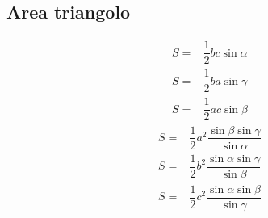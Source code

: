\subsection{Area triangolo}
\begin{align*}
S=&\dfrac{1}{2}bc\sin\alpha\\
S=&\dfrac{1}{2}ba\sin\gamma\\
S=&\dfrac{1}{2}ac\sin\beta
\end{align*}
\begin{align*}
S=&\dfrac{1}{2}a^2\dfrac{\sin\beta\sin\gamma}{\sin\alpha}\\
S=&\dfrac{1}{2}b^2\dfrac{\sin\alpha\sin\gamma}{\sin\beta}\\
S=&\dfrac{1}{2}c^2\dfrac{\sin\alpha\sin\beta}{\sin\gamma}
\end{align*}